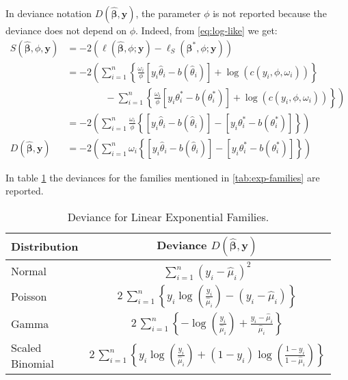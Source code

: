 \documentclass[a4paper, twoside, openright, 12pt]{report}
\theoremstyle{definition}
\theoremstyle{definition}
\theoremstyle{definition}
\theoremstyle{remark}
\begin{document}
In deviance notation \(D(\hat{\boldsymbol{\beta}}, \boldsymbol{y})\), the parameter \(\phi\) is not reported because the deviance does not depend on \(\phi\). Indeed, from \eqref{eq:log-like} we get:
\begin{align*}
S(\hat{\boldsymbol{\beta}}, \phi, \boldsymbol{y})
& =
-2\left(
\ell\left(\hat{\boldsymbol{\beta}}, \phi; \boldsymbol{y}\right)
- \ell_{S}\left(\boldsymbol{\beta}^*, \phi; \boldsymbol{y}\right)
\right)
\\ & =
-2\left(
\sum_{i=1}^{n}{
\left\{
\frac{\omega_i}{\phi} \left[y_i\hat{\theta}_i - b(\hat{\theta}_i) \right] + \log{\left(c(y_i, \phi, \omega_i)\right)}
\right\}
}
\right.
\\ & \qquad \qquad -
\left.
\sum_{i=1}^{n}{
\left\{
\frac{\omega_i}{\phi} \left[y_i\theta_i^* - b(\theta_i^*) \right] + \log{\left(c(y_i, \phi, \omega_i)\right)}
\right\}
}
\right)
\\ & =
-2\left(
\sum_{i=1}^{n}{
\frac{\omega_i}{\phi}
\left\{
\left[y_i\hat{\theta}_i - b(\hat{\theta}_i) \right]
- \left[y_i\theta_i^* - b(\theta_i^*) \right]
\right\}
}
\right)
%
\\[12pt]
%
D(\hat{\boldsymbol{\beta}}, \boldsymbol{y})
& =
-2\left(
\sum_{i=1}^{n}{
\omega_i
\left\{
\left[y_i\hat{\theta}_i - b(\hat{\theta}_i) \right]
- \left[y_i\theta_i^* - b(\theta_i^*) \right]
\right\}
}
\right)
\end{align*}

In table \ref{tab:deviance} the deviances for the families mentioned in \ref{tab:exp-families} are reported.

\begin{table}[!h]

\caption{\label{tab:deviance}Deviance for Linear Exponential Families.}
\centering
\begin{tabular}[t]{lc}
\toprule
\textbf{Distribution} & \textbf{Deviance $D(\hat{\boldsymbol{\beta}}, \boldsymbol{y})$}\\
\midrule[\heavyrulewidth]
Normal & $\sum_{i=1}^{n}{\left( y_i - \hat{\mu}_i \right)^2}$\\
\addlinespace\hline\addlinespace
Poisson & $2\,\sum_{i=1}^{n}{\left\{ y_i \log{\left(\frac{y_i}{\hat{\mu}_i}\right)} - \left( y_i - \hat{\mu}_i \right) \right\}}$\\
\addlinespace\hline\addlinespace
Gamma & $2\,\sum_{i=1}^{n}{\left\{ - \log{\left(\frac{y_i}{\hat{\mu}_i}\right)} + \frac{ y_i - \hat{\mu}_i }{\hat{\mu}_i} \right\}}$\\
\addlinespace\hline\addlinespace
\makecell[l]{Scaled\\Binomial} & $2\,\sum_{i=1}^{n}{\left\{ y_i \log{\left(\frac{y_i}{\hat{\mu}_i}\right)}+ \left(1-y_i\right) \log{\left(\frac{1-y_i}{1-\hat{\mu}_i}\right)} \right\}}$\\
\bottomrule
\end{tabular}
\end{table}
\end{document}
